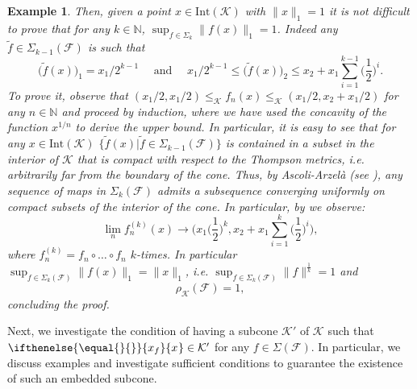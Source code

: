 \documentclass{article}
\newtheorem{example}[theorem]{Example}
\newcommand{\N}{\mathbb{N}}
\newcommand{\family}{\mathcal{F}}
\newcommand{\cradius}{\rho_{\cone}}
\newcommand{\cone}{\mathcal{K}}
\newcommand{\interior}{\mathrm{Int}}
\newcommand{\cleq}{\leq_{\cone}}
\newcommand{\ceigenvector}[1][]{
  \ifthenelse{\equal{#1}{}}
  {{x_f}}
  {{x}_{#1}}}
\begin{document}
\begin{example}
%
Then, given a point $x\in \interior(\cone)$ with $\|x\|_1=1$ it is not difficult to prove that for any $k\in \N$, $\sup_{f\in\Sigma_k}\|f(x)\|_1=1$. Indeed any $\tilde{f}\in \Sigma_{k-1}(\family)$ is such that 
%
\begin{equation}
\big(\tilde{f}(x)\big)_1=x_1/2^{k-1}  \quad \text{ and }\quad  x_1/2^{k-1}   \leq \big(\tilde{f}(x)\big)_2\leq   x_2+x_1\sum_{i=1}^{k-1} \Big(\frac{1}{2}\Big)^i.
\end{equation}
%
To prove it, observe that $(x_1/2,x_1/2)\cleq f_n(x)\cleq (x_1/2,x_2+x_1/2)$ for any $n\in \N$ and proceed by induction, where we have used the concavity of the function $x^{1/n}$ to derive the upper bound.
In particular, it is easy to see that for any $x\in \interior(\cone)$ $\{\tilde{f}(x)| \tilde{f}\in \Sigma_{k-1}(\family)\}$ is contained in a subset in the interior of $\cone$ that is compact with respect to the Thompson metrics, i.e. arbitrarily far from the boundary of the cone.
%
Thus, by Ascoli-Arzelà (see ), any sequence of maps in $\Sigma_k(\family)$ admits a subsequence converging uniformly on compact subsets of the interior of the cone.
In particular, by  we observe:
%
\begin{equation}
    \lim_n f_n^{(k)}(x)\rightarrow \bigg(x_1\Big(\frac{1}{2}\Big)^k , x_2+x_1\sum_{i=1}^k \Big(\frac{1}{2}\Big)^i \bigg),
\end{equation}
where $f_n^{(k)}=f_n\circ \dots \circ f_n$ $k$-times.
%
In particular $\sup_{f\in\Sigma_k(\family)}\|f(x)\|_1=\|x\|_1$, i.e. $\sup_{f\in\Sigma_k(\family)}\|f\|^{\frac{1}{k}}=1$ and 
\begin{equation}
    \cradius(\family)=1,
\end{equation}
concluding the proof.
    
\end{example}


Next, we investigate the condition of having a subcone $\cone'$ of $\cone$ such that $\ceigenvector\in \cone'$ for any $f\in\Sigma(\family)$. In particular, we discuss examples and investigate sufficient conditions to guarantee the existence of such an embedded subcone.
\end{document}
